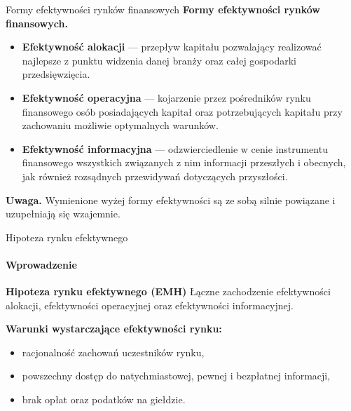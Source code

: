\documentclass[a4paper, 11pt]{beamer}
\begin{document}
	\begin{frame}{Formy efektywności rynków finansowych}
		\textbf{Formy efektywności rynków finansowych.}
		\begin{itemize}
			\item \textbf{Efektywność alokacji} --- przepływ kapitału pozwalający realizować najlepsze
				z punktu widzenia danej branży oraz całej gospodarki przedsięwzięcia.
			\item \textbf{Efektywność operacyjna} --- kojarzenie przez pośredników rynku finansowego
				osób posiadających kapitał oraz potrzebujących kapitału przy zachowaniu możliwie
				optymalnych warunków.
			\item \textbf{Efektywność informacyjna} --- odzwierciedlenie w cenie instrumentu finansowego
				wszystkich związanych z nim informacji przeszłych i obecnych, jak również rozsądnych
				przewidywań dotyczących przyszłości.
		\end{itemize}
		\begin{alert}{\textbf{Uwaga.}}
			Wymienione wyżej formy efektywności są ze sobą silnie powiązane i uzupełniają się wzajemnie.
		\end{alert}
	\end{frame}
	
	\begin{frame}{Hipoteza rynku efektywnego}
		\framesubtitle{Wprowadzenie}
		\begin{block}{\textbf{Hipoteza rynku efektywnego (EMH)}}
			Łączne zachodzenie efektywności alokacji, efektywności operacyjnej oraz efektywności informacyjnej.
		\end{block}
		\textbf{Warunki wystarczające efektywności rynku:}
		\begin{itemize}
			\item racjonalność zachowań uczestników rynku,
			\item powszechny dostęp do natychmiastowej, pewnej i bezpłatnej informacji,
			\item brak opłat oraz podatków na giełdzie.
		\end{itemize}
	\end{frame}
	
\end{document}
